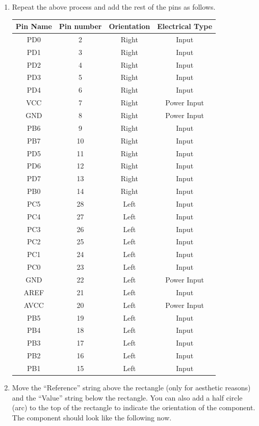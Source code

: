 \documentclass[12pt,letterpaper]{scrartcl}
\begin{document}
\begin{enumerate}
	\item Repeat the above process and add the rest of the pins as follows. 
		\begin{table}[h]
			\begin{tabular}{|c|c|c|c|}
				\hline  \bf Pin Name & Pin number & Orientation & Electrical Type \\ 
				\hline \hline PD0 & 2 & Right & Input \\ 
				\hline PD1 & 3 & Right & Input \\ 
				\hline PD2 & 4 & Right & Input \\ 
				\hline PD3 & 5 & Right & Input \\ 
				\hline PD4 & 6 & Right & Input \\ 
				\hline VCC & 7 & Right & Power Input \\ 
				\hline GND & 8 & Right & Power Input \\ 
				\hline PB6 & 9 & Right & Input \\ 
				\hline PB7 & 10 & Right & Input \\ 
				\hline PD5 & 11 & Right & Input \\ 
				\hline PD6 & 12 & Right & Input \\ 
				\hline PD7 & 13 & Right & Input \\ 
				\hline PB0 & 14 & Right & Input \\ 
				\hline PC5 & 28 & Left & Input \\ 
				\hline PC4 & 27 & Left & Input \\ 
				\hline PC3 & 26 & Left & Input \\ 
				\hline PC2 & 25 & Left & Input \\ 
				\hline PC1 & 24 & Left & Input \\ 
				\hline PC0 & 23 & Left & Input \\ 
				\hline GND & 22 & Left & Power Input \\ 
				\hline AREF & 21 & Left & Input \\ 
				\hline AVCC & 20 & Left & Power Input \\ 
				\hline PB5 & 19 & Left & Input \\ 
				\hline PB4 & 18 & Left & Input \\ 
				\hline PB3 & 17 & Left & Input \\ 
				\hline PB2 & 16 & Left & Input \\ 
				\hline PB1 & 15 & Left & Input \\ 
				\hline 
			\end{tabular} 
		\end{table}
	
	\item Move the ``Reference'' string above the rectangle (only for aesthetic reasons) and the ``Value'' string below the rectangle. You can also add a half circle (arc) to the top of the rectangle to indicate the orientation of the component. The component should look like the following now. 
	
\end{enumerate}
\end{document}

